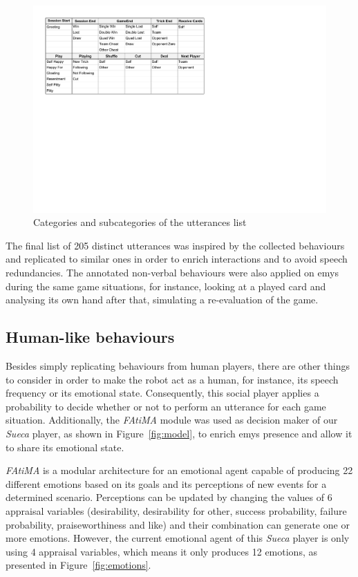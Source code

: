 \begin{figure}[ht]
	\centering
    \includegraphics[width=1\textwidth]{./img/6/utterances}
	\caption{Categories and subcategories of the utterances list}
\label{fig:utterances}
\end{figure}

The final list of 205 distinct utterances was inspired by the collected behaviours and replicated to similar ones in order to enrich interactions and to avoid speech redundancies.
The annotated non-verbal behaviours were also applied on \ac{emys} during the same game situations, for instance, looking at a played card and analysing its own hand after that, simulating a re-evaluation of the game.

\subsection{Human-like behaviours}

Besides simply replicating behaviours from human players, there are other things to consider in order to make the robot act as a human, for instance, its speech frequency or its emotional state.
Consequently, this social player applies a probability to decide whether or not to perform an utterance for each game situation.
Additionally, the \emph{FAtiMA} module was used as decision maker of our \emph{Sueca} player, as shown in Figure~\ref{fig:model}, to enrich \ac{emys} presence and allow it to share its emotional state.

\emph{FAtiMA} is a modular architecture for an emotional agent capable of producing 22 different emotions based on its goals and its perceptions of new events for a determined scenario.
Perceptions can be updated by changing the values of 6 appraisal variables (desirability, desirability for other, success probability, failure probability, praiseworthiness and like) and their combination can generate one or more emotions.
However, the current emotional agent of this \emph{Sueca} player is only using 4 appraisal variables, which means it only produces 12 emotions, as presented in Figure~\ref{fig:emotions}.

